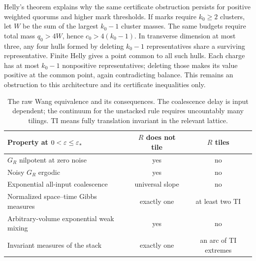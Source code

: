 \begin{remark}
Helly's theorem \cite{Helly23} explains why the same certificate obstruction persists for positive weighted quorums and higher mark thresholds. If marks require $k_0\ge2$ clusters, let $W$ be the sum of the largest $k_0-1$ cluster masses. The same budgets require total mass $q_0>4W$, hence $c_0>4(k_0-1)$. In transverse dimension at most three, any four hulls formed by deleting $k_0-1$ representatives share a surviving representative. Finite Helly gives a point common to all such hulls. Each charge has at most $k_0-1$ nonpositive representatives; deleting those makes its value positive at the common point, again contradicting balance. This remains an obstruction to this architecture and its certificate inequalities only.
\end{remark}

\begin{table}[ht]
\centering\small
\begin{tabularx}{\textwidth}{@{}Xcc@{}}
\toprule
Property at $0<\varepsilon\le\varepsilon_*$ & $R$ does not tile & $R$ tiles\\
\midrule
$G_R$ nilpotent at zero noise & yes & no\\
Noisy $G_R$ ergodic & yes & no\\
Exponential all-input coalescence & universal slope & no\\
Normalized space--time Gibbs measures & exactly one & at least two TI\\
Arbitrary-volume exponential weak mixing & yes & no\\
Invariant measures of the stack & exactly one & an arc of TI extremes\\
\bottomrule
\end{tabularx}
\caption{The raw Wang equivalence and its consequences. The coalescence delay is input dependent; the continuum for the unstacked rule requires uncountably many tilings. TI means fully translation invariant in the relevant lattice.}\label{tab:summary}
\end{table}



